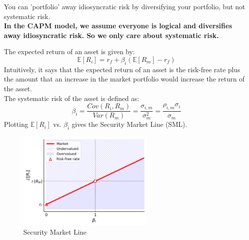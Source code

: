 \begin{proposition}
    You can 'portfolio' away idiosyncratic risk by diversifying your portfolio, but not systematic risk.\\
    \textbf{In the CAPM model, we assume everyone is logical and diversifies away idiosyncratic risk. So we only care about systematic risk.}
\end{proposition}

\begin{theorem}
    The expected return of an asset is given by:
    \begin{equation}
        \mathbb{E}[R_i] = r_f + \beta_i(\mathbb{E}[R_m] - r_f)
    \end{equation}
    Intuitively, it says that the expected return of an asset is the risk-free rate plus the amount that an increase in the market portfolio would increase the return of the asset.\\
    The systematic risk of the asset is defined as:
    \begin{equation}
        \beta_i = \frac{Cov(R_i,R_m)}{Var(R_m)} = \frac{\sigma_{i,m}}{\sigma_{m}^2} = \frac{\rho_{i,m} \sigma_i}{\sigma_{m}}
    \end{equation}
    Plotting $\mathbb{E}[R_i]$ vs. $\beta_i$ gives the Security Market Line (SML).\\
\end{theorem}

\begin{figure}[h!]
    \centering
    \includegraphics[width=0.6\textwidth]{LECTURE_4/SML.png}
    \caption{Security Market Line}
    \label{fig:security_market_line}
\end{figure}

